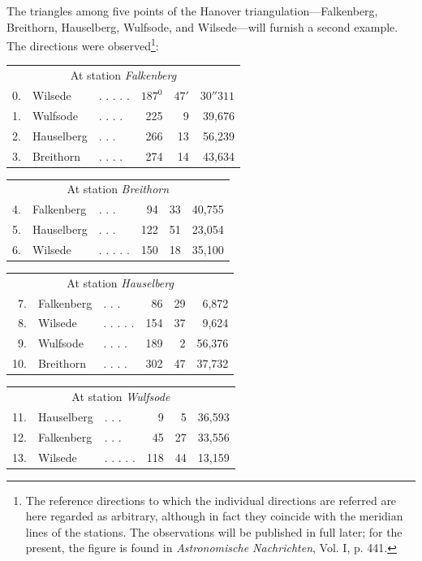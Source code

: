 The triangles among five points of the Hanover triangulation—Falkenberg, Breithorn, Hauselberg, Wulfsode, and Wilsede—will furnish a second example. The directions were observed\footnote{The reference directions to which the individual directions are referred are here regarded as arbitrary, although in fact they coincide with the meridian lines of the stations. The observations will be published in full later; for the present, the figure is found in \textit{Astronomische Nachrichten}, Vol. I, p. 441.}:
\begin{center}
\begin{tabular}{r l l r r r}
\multicolumn{6}{c}{At station \textit{Falkenberg}}\\[5pt]
0.&Wilsede&. . . . .&\(187^0\)&\(47'\)&\(30''311\)\\
1.&Wulfsode&. . . .&225&9&39,676\\
2.&Hauselberg&. . .&266&13&56,239\\
3.&Breithorn&. . . .&274&14&43,634
\end{tabular}
\end{center}
\begin{center}
\begin{tabular}{r l l r r r}
\multicolumn{6}{c}{At station \textit{Breithorn}}\\[5pt]
4.&Falkenberg&. . .&94&33&40,755\\
5.&Hauselberg&. . .&122&51&23,054\\
6.&Wilsede&. . . . .&150&18&35,100
\end{tabular}
\end{center}
\begin{center}
\begin{tabular}{r l l r r r}
\multicolumn{6}{c}{At station \textit{Hauselberg}}\\[5pt]
7.&Falkenberg&. . .&86&29&6,872\\
8.&Wilsede&. . . . .&154&37&9,624\\
9.&Wulfsode&. . . .&189&2&56,376\\
10.&Breithorn&. . . .&302&47&37,732
\end{tabular}
\end{center}
\begin{center}
\begin{tabular}{r l l r r r}
\multicolumn{6}{c}{At station \textit{Wulfsode}}\\[5pt]
11.&Hauselberg&. . .&9&5&36,593\\
12.&Falkenberg&. . .&45&27&33,556\\
13.&Wilsede&. . . . .&118&44&13,159
\end{tabular}
\end{center}
